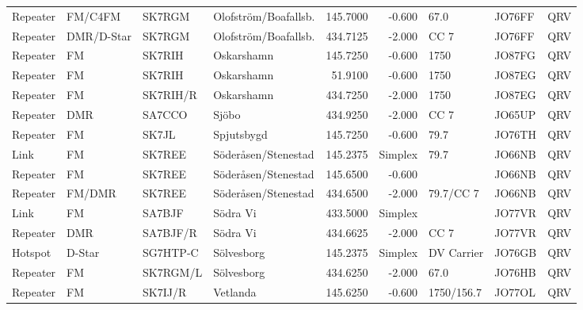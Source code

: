 \begin{landscape}
\begin{longtable}{llllrrlll}
	Repeater & FM/C4FM         & SK7RGM   & Olofström/Boafallsb. &     145.7000 &     -0.600 & 67.0              & JO76FF      & QRV      \\
	Repeater & DMR/D-Star      & SK7RGM   & Olofström/Boafallsb. &     434.7125 &     -2.000 & CC 7              & JO76FF      & QRV      \\
	Repeater & FM              & SK7RIH   & Oskarshamn           &     145.7250 &     -0.600 & 1750              & JO87FG      & QRV      \\
	Repeater & FM              & SK7RIH   & Oskarshamn           &      51.9100 &     -0.600 & 1750              & JO87EG      & QRV      \\
	Repeater & FM              & SK7RIH/R & Oskarshamn           &     434.7250 &     -2.000 & 1750              & JO87EG      & QRV      \\
	Repeater & DMR             & SA7CCO   & Sjöbo                &     434.9250 &     -2.000 & CC 7              & JO65UP      & QRV      \\
	Repeater & FM              & SK7JL    & Spjutsbygd           &     145.7250 &     -0.600 & 79.7              & JO76TH      & QRV      \\
	Link     & FM              & SK7REE   & Söderåsen/Stenestad  &     145.2375 &    Simplex & 79.7              & JO66NB      & QRV      \\
	Repeater & FM              & SK7REE   & Söderåsen/Stenestad  &     145.6500 &     -0.600 &                   & JO66NB      & QRV      \\
	Repeater & FM/DMR          & SK7REE   & Söderåsen/Stenestad  &     434.6500 &     -2.000 & 79.7/CC 7         & JO66NB      & QRV      \\
	Link     & FM              & SA7BJF   & Södra Vi             &     433.5000 &    Simplex &                   & JO77VR      & QRV      \\
	Repeater & DMR             & SA7BJF/R & Södra Vi             &     434.6625 &     -2.000 & CC 7              & JO77VR      & QRV      \\
	Hotspot  & D-Star          & SG7HTP-C & Sölvesborg           &     145.2375 &    Simplex & DV Carrier        & JO76GB      & QRV      \\
	Repeater & FM              & SK7RGM/L & Sölvesborg           &     434.6250 &     -2.000 & 67.0              & JO76HB      & QRV      \\
	Repeater & FM              & SK7IJ/R  & Vetlanda             &     145.6250 &     -0.600 & 1750/156.7        & JO77OL      & QRV      \\

\end{longtable}
\end{landscape}
